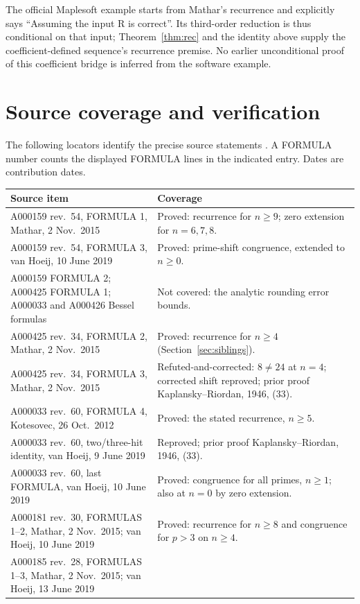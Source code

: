 \documentclass[11pt]{article}
\begin{document}
The official Maplesoft example \cite{maple} starts from Mathar's
recurrence and explicitly says ``Assuming the input R is correct''.
Its third-order reduction is thus conditional on that input;
Theorem~\ref{thm:rec} and the identity above supply the coefficient-defined
sequence's recurrence premise. No earlier unconditional proof of this
coefficient bridge is inferred from the software example.

\section{Source coverage and verification}
The following locators identify the precise source statements
\cite{a159,a58087,siblings}. A FORMULA number counts the displayed
FORMULA lines in the indicated entry. Dates are contribution dates.
\begingroup\small
\begin{longtable}{p{.46\linewidth}p{.45\linewidth}}
\toprule Source item & Coverage\\\midrule\endhead
A000159 rev.~54, FORMULA 1, Mathar, 2 Nov.~2015
& Proved: recurrence for $n\geq9$; zero extension for $n=6,7,8$.\\[3pt]
A000159 rev.~54, FORMULA 3, van Hoeij, 10 June 2019
& Proved: prime-shift congruence, extended to $n\geq0$.\\[3pt]
A000159 FORMULA 2; A000425 FORMULA 1; A000033 and A000426 Bessel formulas
& Not covered: the analytic rounding error bounds.\\[3pt]
A000425 rev.~34, FORMULA 2, Mathar, 2 Nov.~2015
& Proved: recurrence for $n\geq4$ (Section~\ref{sec:siblings}).\\[3pt]
A000425 rev.~34, FORMULA 3, Mathar, 2 Nov.~2015
& Refuted-and-corrected: $8\ne24$ at $n=4$; corrected shift reproved; prior proof Kaplansky--Riordan, 1946, (33).\\[3pt]
A000033 rev.~60, FORMULA 4, Kotesovec, 26 Oct.~2012
& Proved: the stated recurrence, $n\geq5$.\\[3pt]
A000033 rev.~60, two/three-hit identity, van Hoeij, 9 June 2019
& Reproved; prior proof Kaplansky--Riordan, 1946, (33).\\[3pt]
A000033 rev.~60, last FORMULA, van Hoeij, 10 June 2019
& Proved: congruence for all primes, $n\geq1$; also at $n=0$ by zero extension.\\[3pt]
A000181 rev.~30, FORMULAS 1--2, Mathar, 2 Nov.~2015; van Hoeij, 10 June 2019
& Proved: recurrence for $n\geq8$ and congruence for $p>3$ on $n\geq4$.\\[3pt]
A000185 rev.~28, FORMULAS 1--3, Mathar, 2 Nov.~2015; van Hoeij, 13 June 2019

\end{longtable}
\end{document}
